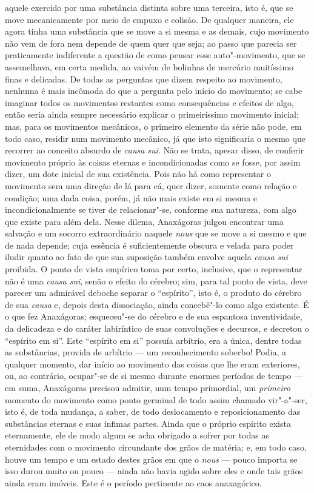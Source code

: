 aquele exercido por uma substância distinta sobre uma terceira, isto é, que
se move mecanicamente por meio de empuxo e colisão. De qualquer maneira, ele
agora tinha uma substância que se move a si mesma e as demais, cujo movimento
não vem de fora nem depende de quem quer que seja; ao passo que parecia ser
praticamente indiferente a questão de como pensar esse auto"-movimento, que
se assemelhava, em certa medida, ao vaivém de bolinhas de mercúrio muitíssimo
finas e delicadas. De todas as perguntas que dizem respeito ao movimento,
nenhuma é mais incômoda do que a pergunta pelo início do movimento; se cabe
imaginar todos os movimentos restantes como consequências e efeitos de algo,
então seria ainda sempre necessário explicar o primeiríssimo movimento
inicial; mas, para os movimentos mecânicos, o primeiro elemento da série não
pode, em todo caso, residir num movimento mecânico, já que isto significaria
o mesmo que recorrer ao conceito absurdo de \textit{causa \label{causasui} sui}.
Não se trata, apesar disso, de conferir movimento próprio às coisas eternas e 
incondicionadas como se fosse, por assim dizer, um dote
inicial de sua existência. Pois não há como representar o movimento sem uma
direção de lá para cá, quer dizer, somente como relação e condição; uma dada
coisa, porém, já não mais existe em si mesma e incondicionalmente se tiver de
relacionar"-se, conforme sua natureza, com algo que existe para além dela.
Nesse dilema, Anaxágoras \label{nessedilema} julgou encontrar uma salvação e
um socorro extraordinário naquele
\textit{nous} que se move a si mesmo e que de nada depende; cuja essência é
 suficientemente obscura e velada para poder iludir quanto ao fato de que sua
 suposição também envolve aquela \textit{causa sui} proibida. O ponto de
 vista empírico toma por certo, inclusive, que o representar não é
 uma \textit{causa sui}, senão o efeito do cérebro; sim, para tal ponto de
 vista, deve parecer um admirável deboche separar o ``espírito'', isto é, o
 produto do cérebro de sua \textit{causa} e, depois desta dissociação, ainda
 concebê"-lo como algo existente. É o que fez Anaxágoras; esqueceu"-se do
 cérebro e de sua espantosa inventividade, da delicadeza e do caráter
 labiríntico de suas convoluções e decursos, e decretou o ``espírito em si''.
 Este ``espírito em si'' possuía arbítrio, era a única, dentre todas as
 substâncias, provida de arbítrio --- um reconhecimento soberbo! Podia, a
 qualquer momento, dar início ao movimento das coisas que lhe eram
 exteriores, ou, ao contrário, ocupar"-se de si mesmo durante enormes
 períodos de tempo --- em suma, Anaxágoras precisou admitir, num tempo
 primordial, um \textit{primeiro} momento do movimento como ponto germinal de todo assim
 chamado vir"-a"-ser, isto é, de toda mudança, a saber, de todo deslocamento
 e reposicionamento das substâncias eternas e suas ínfimas partes. Ainda que
 o próprio espírito exista eternamente, ele de modo algum se acha obrigado a
 sofrer por todas as eternidades com o movimento circundante dos grãos de
 matéria; e, em todo caso, houve um tempo e um estado destes grãos em que
 o \textit{nous} --- pouco importa se isso durou muito ou pouco --- ainda não
 havia agido sobre eles e onde tais grãos ainda eram imóveis. Este é o
 período pertinente ao caos anaxagórico.

